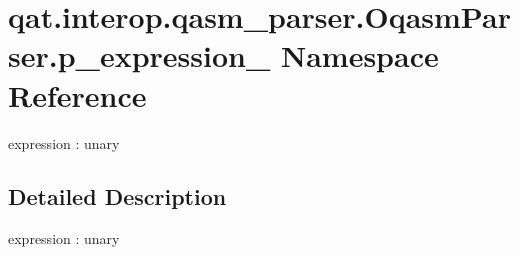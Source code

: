 \hypertarget{namespaceqat_1_1interop_1_1qasm__parser_1_1OqasmParser_1_1p__expression__2}{\section{qat.\-interop.\-qasm\-\_\-parser.\-Oqasm\-Parser.\-p\-\_\-expression\-\_ Namespace Reference}
\label{namespaceqat_1_1interop_1_1qasm__parser_1_1OqasmParser_1_1p__expression__2}
}


expression \-: unary  




\subsection{Detailed Description}
expression \-: unary 